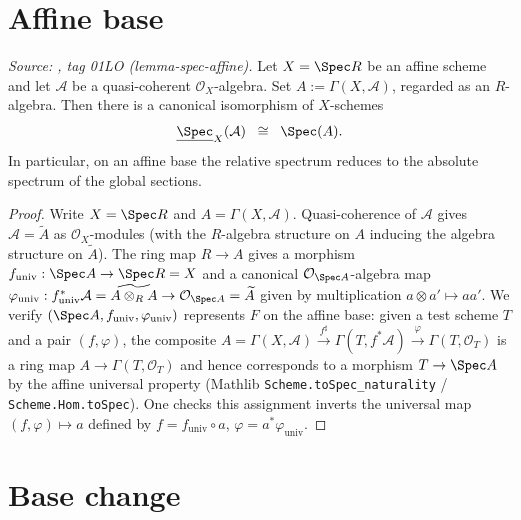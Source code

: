 \section{Affine base}
\label{sec:relspec_affine}

\begin{theorem}
  \label{thm:relative_spec_affine_base}
  \textit{Source: \cite{stacks-project}, tag 01LO (lemma-spec-affine).}
  Let \(X = \Spec R\) be an affine scheme and let \(\mathcal{A}\) be a quasi-coherent
  \(\mathcal{O}_X\)-algebra. Set \(A := \Gamma(X, \mathcal{A})\), regarded as an
  \(R\)-algebra. Then there is a canonical isomorphism of \(X\)-schemes
  \[
    \underline{\Spec}_X(\mathcal{A}) \;\;\cong\;\; \Spec(A).
  \]
  In particular, on an affine base the relative spectrum reduces to the absolute
  spectrum of the global sections.
\end{theorem}

\begin{proof}
  Write \(X = \Spec R\) and \(A = \Gamma(X, \mathcal{A})\). Quasi-coherence of
  \(\mathcal{A}\) gives \(\mathcal{A} = \widetilde{A}\) as \(\mathcal{O}_X\)-modules
  (with the \(R\)-algebra structure on \(A\) inducing the algebra structure on
  \(\widetilde A\)). The ring map \(R \to A\) gives a morphism
  \(f_{\mathrm{univ}} : \Spec A \to \Spec R = X\) and a canonical
  \(\mathcal{O}_{\Spec A}\)-algebra map
  $\varphi_{\mathrm{univ}} : f_{\mathrm{univ}}^* \mathcal{A} = \widetilde{A \otimes_R A}
  \to \mathcal{O}_{\Spec A} = \widetilde A$ given by multiplication
  \(a \otimes a' \mapsto aa'\). We verify \((\Spec A, f_{\mathrm{univ}}, \varphi_{\mathrm{univ}})\)
  represents \(F\) on the affine base: given a test scheme \(T\) and a pair
  \((f, \varphi)\), the composite
  $A = \Gamma(X, \mathcal{A}) \xrightarrow{f^\sharp}
  \Gamma(T, f^*\mathcal{A}) \xrightarrow{\varphi} \Gamma(T, \mathcal{O}_T)$
  is a ring map \(A \to \Gamma(T, \mathcal{O}_T)\) and hence corresponds to a morphism
  \(T \to \Spec A\) by the affine universal property
  (Mathlib \texttt{Scheme.toSpec\_naturality} /
  \texttt{Scheme.Hom.toSpec}). One checks this assignment inverts the universal map
  \((f, \varphi) \mapsto a\) defined by \(f = f_{\mathrm{univ}} \circ a\),
  \(\varphi = a^* \varphi_{\mathrm{univ}}\).
\end{proof}

\section{Base change}
\label{sec:relspec_basechange}

